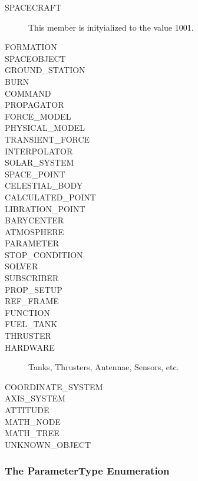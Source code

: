 \begin{description}
\item[SPACECRAFT] This member is inityialized to the value 1001.
\item[FORMATION]
\item[SPACEOBJECT]
\item[GROUND\_STATION]
\item[BURN]
\item[COMMAND]
\item[PROPAGATOR]
\item[FORCE\_MODEL]
\item[PHYSICAL\_MODEL]
\item[TRANSIENT\_FORCE]
\item[INTERPOLATOR]
\item[SOLAR\_SYSTEM]
\item[SPACE\_POINT]
\item[CELESTIAL\_BODY]
\item[CALCULATED\_POINT]
\item[LIBRATION\_POINT]
\item[BARYCENTER]
\item[ATMOSPHERE]
\item[PARAMETER]
\item[STOP\_CONDITION]
\item[SOLVER]
\item[SUBSCRIBER]
\item[PROP\_SETUP]
\item[REF\_FRAME]
\item[FUNCTION]
\item[FUEL\_TANK]
\item[THRUSTER]
\item[HARDWARE] Tanks, Thrusters, Antennae, Sensors, etc.
\item[COORDINATE\_SYSTEM]
\item[AXIS\_SYSTEM]
\item[ATTITUDE]
\item[MATH\_NODE]
\item[MATH\_TREE]
\item[UNKNOWN\_OBJECT]
\end{description}

\subsubsection{The ParameterType Enumeration}

